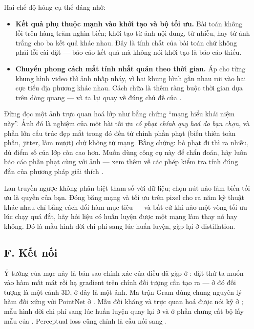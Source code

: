 \documentclass[../../../deep_learning.tex]{subfiles}
\begin{document}
Hai chế độ hỏng cụ thể đáng nhớ:
\begin{itemize}
\item \textbf{Kết quả phụ thuộc mạnh vào khởi tạo và bộ tối ưu.} Bài toán không lồi trên hàng trăm nghìn biến; khởi tạo từ ảnh nội dung, từ nhiễu, hay từ ảnh trắng cho ba kết quả khác nhau. Đây là tính chất của bài toán chứ không phải lỗi cài đặt --- báo cáo kết quả mà không nói khởi tạo là báo cáo thiếu.
\item \textbf{Chuyển phong cách mất tính nhất quán theo thời gian.} Áp cho từng khung hình video thì ảnh nhấp nháy, vì hai khung hình gần nhau rơi vào hai cực tiểu địa phương khác nhau. Cách chữa là thêm ràng buộc thời gian dựa trên dòng quang --- và ta lại quay về đúng chủ đề của .
\end{itemize}

\begin{cambay}
Đừng đọc một ảnh trực quan hoá lớp như bằng chứng ``mạng hiểu khái niệm này''. Ảnh đó là nghiệm của một bài tối ưu \emph{có phạt chính quy hoá do bạn chọn}, và phần lớn cấu trúc đẹp mắt trong đó đến từ chính phần phạt (biến thiên toàn phần, jitter, làm mượt) chứ không từ mạng. Bằng chứng: bỏ phạt đi thì ra nhiễu, dù điểm số của lớp còn cao hơn. Muốn dùng công cụ này để chẩn đoán, hãy luôn báo cáo phần phạt cùng với ảnh --- xem thêm  về các phép kiểm tra tính đúng đắn của phương pháp giải thích \cite{adebayo2018sanity}.
\end{cambay}

\begin{cannho}
Lan truyền ngược không phân biệt tham số với dữ liệu; chọn nút nào làm biến tối ưu là quyền của bạn. Đóng băng mạng và tối ưu trên pixel cho ra năm kỹ thuật khác nhau chỉ bằng cách đổi hàm mục tiêu --- và bất cứ khi nào một vòng tối ưu lúc chạy quá đắt, hãy hỏi liệu có huấn luyện được một mạng làm thay nó hay không. Đó là mẫu hình dời chi phí sang lúc huấn luyện, gặp lại ở distillation. 
\end{cannho}

\subsection{F. Kết nối}
Ý tưởng của mục này là bản sao chính xác của điều đã gặp ở : đặt thứ ta muốn vào hàm mất mát rồi hạ gradient trên chính đối tượng cần tạo ra --- ở đó đối tượng là một cảnh 3D, ở đây là một ảnh. Ma trận Gram dùng chung nguyên lý hàm đối xứng với PointNet ở . Mẫu đối kháng và trực quan hoá được nói kỹ ở ; mẫu hình dời chi phí sang lúc huấn luyện quay lại ở  \cite{hinton2015distilling} và ở phần chưng cất bộ lấy mẫu của . Perceptual loss cũng chính là cầu nối sang .
\end{document}
